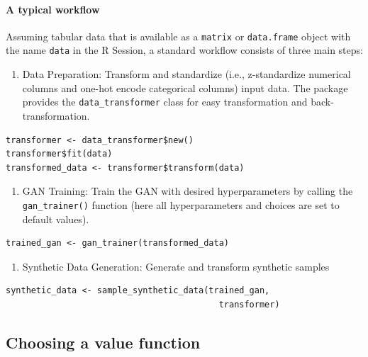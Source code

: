 \paragraph{\texorpdfstring{A typical  workflow}{A typical  workflow}}\label{a-typical-workflow}

Assuming tabular data that is available as a \texttt{matrix} or \texttt{data.frame} object with the name \texttt{data} in the R Session, a standard  workflow consists of three main steps:

\begin{enumerate}
\def\labelenumi{\arabic{enumi}.}
\tightlist
\item
  Data Preparation: Transform and standardize (i.e., z-standardize numerical columns and one-hot encode categorical columns) input data. The  package provides the \texttt{data\_transformer} class for easy transformation and back-transformation.
\end{enumerate}

\begin{verbatim}
transformer <- data_transformer$new()
transformer$fit(data)
transformed_data <- transformer$transform(data)
\end{verbatim}

\begin{enumerate}
\def\labelenumi{\arabic{enumi}.}
\setcounter{enumi}{1}
\tightlist
\item
  GAN Training: Train the GAN with desired hyperparameters by calling the \texttt{gan\_trainer()} function (here all hyperparameters and choices are set to default values).
\end{enumerate}

\begin{verbatim}
trained_gan <- gan_trainer(transformed_data)
\end{verbatim}

\begin{enumerate}
\def\labelenumi{\arabic{enumi}.}
\setcounter{enumi}{2}
\tightlist
\item
  Synthetic Data Generation: Generate and transform synthetic samples
\end{enumerate}

\begin{verbatim}
synthetic_data <- sample_synthetic_data(trained_gan, 
                                          transformer)
\end{verbatim}

\subsection{Choosing a value function}\label{sec:value}

